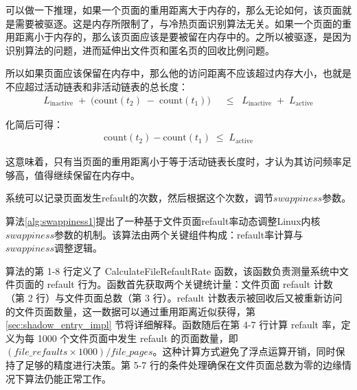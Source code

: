 可以做一下推理，如果一个页面的重用距离大于内存的，那么无论如何，该页面就是需要被驱逐。这是内存所限制了，与冷热页面识别算法无关。如果一个页面的重用距离小于内存的，那么该页面应该是要被留在内存中的。之所以被驱逐，是因为识别算法的问题，进而延伸出文件页和匿名页的回收比例问题。

所以如果页面应该保留在内存中，那么他的访问距离不应该超过内存大小，也就是不应超过活动链表和非活动链表的总长度：
\begin{align}
  \label{eq:active_condition_1}
  L_{\mathrm{inactive}}
  \;+\;
  \bigl(\mathrm{count}(t_2) \;-\; \mathrm{count}(t_1)\bigr)
  &\;\;\le\;\;
  L_{\mathrm{inactive}}
  \;+\;
  L_{\mathrm{active}}
\end{align}

化简后可得：
\begin{align}
  \label{eq:active_condition}
  \mathrm{count}(t_2) - \mathrm{count}(t_1)
  \;\le\;
  L_{\mathrm{active}}
\end{align}

这意味着，只有当页面的重用距离小于等于活动链表长度时，才认为其访问频率足够高，值得继续保留在内存中。

系统可以记录页面发生refault的次数，然后根据这个次数，调节\(swappiness\)参数。

算法\ref{alg:swappiness1}提出了一种基于文件页面refault率动态调整Linux内核\(swappiness\)参数的机制。该算法由两个关键组件构成：refault率计算与\(swappiness\)调整逻辑。

算法的第 1-8 行定义了 CalculateFileRefaultRate 函数，该函数负责测量系统中文件页面的 refault 行为。函数首先获取两个关键统计量：文件页面 refault 计数（第 2 行）与文件页面总数（第 3 行）。refault 计数表示被回收后又被重新访问的文件页面数量，这一数据可以通过重用距离近似获得，第 \ref{sec:shadow_entry_impl} 节将详细解释。函数随后在第 4-7 行计算 refault 率，定义为每 1000 个文件页面中发生 refault 的页面数量，即 \((file\_refaults \times 1000) / file\_pages\)。这种计算方式避免了浮点运算开销，同时保持了足够的精度进行决策。第 5-7 行的条件处理确保在文件页面总数为零的边缘情况下算法仍能正常工作。

